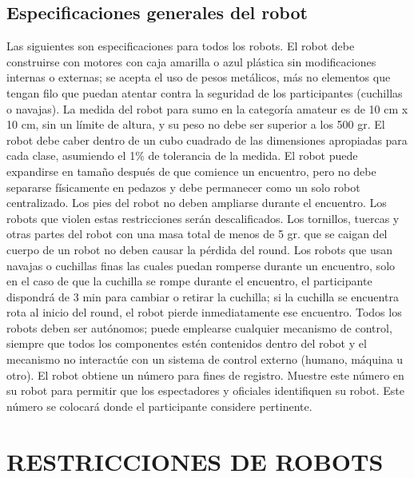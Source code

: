 \documentclass[
  letterpaper,
  DIV=11,
  numbers=noendperiod]{scrreprt}
\begin{document}
\subsection{Especificaciones generales del
robot}\label{especificaciones-generales-del-robot}

Las siguientes son especificaciones para todos los robots. El robot debe
construirse con motores con caja amarilla o azul plástica sin
modificaciones internas o externas; se acepta el uso de pesos metálicos,
más no elementos que tengan filo que puedan atentar contra la seguridad
de los participantes (cuchillas o navajas). La medida del robot para
sumo en la categoría amateur es de 10 cm x 10 cm, sin un límite de
altura, y su peso no debe ser superior a los 500 gr. El robot debe caber
dentro de un cubo cuadrado de las dimensiones apropiadas para cada
clase, asumiendo el 1\% de tolerancia de la medida. El robot puede
expandirse en tamaño después de que comience un encuentro, pero no debe
separarse físicamente en pedazos y debe permanecer como un solo robot
centralizado. Los pies del robot no deben ampliarse durante el
encuentro. Los robots que violen estas restricciones serán
descalificados. Los tornillos, tuercas y otras partes del robot con una
masa total de menos de 5 gr. que se caigan del cuerpo de un robot no
deben causar la pérdida del round. Los robots que usan navajas o
cuchillas finas las cuales puedan romperse durante un encuentro, solo en
el caso de que la cuchilla se rompe durante el encuentro, el
participante dispondrá de 3 min para cambiar o retirar la cuchilla; si
la cuchilla se encuentra rota al inicio del round, el robot pierde
inmediatamente ese encuentro. Todos los robots deben ser autónomos;
puede emplearse cualquier mecanismo de control, siempre que todos los
componentes estén contenidos dentro del robot y el mecanismo no
interactúe con un sistema de control externo (humano, máquina u otro).
El robot obtiene un número para fines de registro. Muestre este número
en su robot para permitir que los espectadores y oficiales identifiquen
su robot. Este número se colocará donde el participante considere
pertinente.

\section{RESTRICCIONES DE ROBOTS}\label{restricciones-de-robots}
\end{document}
